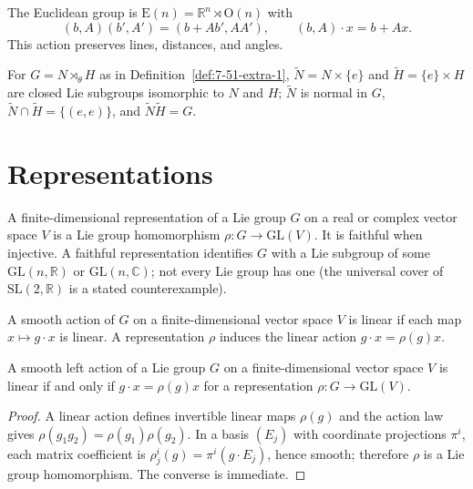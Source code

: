\begin{example}
\label{ex:7-32}
\leanok
{}
The Euclidean group is $\mathrm E(n)=\mathbb R^n\rtimes\mathrm O(n)$ with
\[
(b,A)(b',A')=(b+Ab',AA'),\qquad (b,A)\cdot x=b+Ax.
\]
This action preserves lines, distances, and angles.
\end{example}

\begin{proposition}
\label{prop:7-33}
\leanok
{}
For $G=N\rtimes_\theta H$ as in Definition~\ref{def:7-51-extra-1},
$\widetilde N=N\times\{e\}$ and $\widetilde H=\{e\}\times H$ are closed Lie
subgroups isomorphic to $N$ and $H$; $\widetilde N$ is normal in $G$,
$\widetilde N\cap\widetilde H=\{(e,e)\}$, and
$\widetilde N\widetilde H=G$.
\end{proposition}


\section{Representations}

\begin{definition}
\label{def:7-52-extra-1}
\leanok
A finite-dimensional representation of a Lie group $G$ on a real or complex vector space $V$ is a Lie group homomorphism $\rho:G\to\mathrm{GL}(V)$. It is faithful when injective. A faithful representation identifies $G$ with a Lie subgroup of some $\mathrm{GL}(n,\mathbb R)$ or $\mathrm{GL}(n,\mathbb C)$; not every Lie group has one (the universal cover of $\mathrm{SL}(2,\mathbb R)$ is a stated counterexample).
\end{definition}

\begin{definition}
\label{def:7-52-extra-2}
\leanok
A smooth action of $G$ on a finite-dimensional vector space $V$ is linear if each map $x\mapsto g\cdot x$ is linear. A representation $\rho$ induces the linear action $g\cdot x=\rho(g)x$.
\end{definition}

\begin{proposition}
\label{prop:7-37}
\leanok
{}
A smooth left action of a Lie group $G$ on a finite-dimensional vector space $V$ is linear if and only if $g\cdot x=\rho(g)x$ for a representation $\rho:G\to\mathrm{GL}(V)$.
\end{proposition}

\begin{proof}
\leanok
\sketch A linear action defines invertible linear maps $\rho(g)$ and the action law gives $\rho(g_1g_2)=\rho(g_1)\rho(g_2)$. In a basis $(E_j)$ with coordinate projections $\pi^i$, each matrix coefficient is $\rho^i_j(g)=\pi^i(g\cdot E_j)$, hence smooth; therefore $\rho$ is a Lie group homomorphism. The converse is immediate.
\end{proof}
